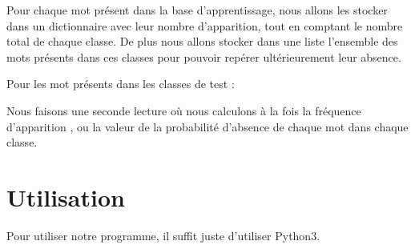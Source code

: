 \documentclass[a4paper,11pt]{article}
\begin{document}
Pour chaque mot présent dans la base d'apprentissage, nous allons les stocker dans un dictionnaire avec leur nombre d'apparition, tout en comptant le nombre total de chaque classe. De plus nous allons stocker dans une liste l'ensemble des mots présents dans ces classes pour pouvoir repérer ultérieurement leur absence.

Pour les mot présents dans les classes de test :

Nous faisons une seconde lecture où nous calculons à la fois la fréquence d'apparition , ou la valeur de la probabilité d'absence de chaque mot dans chaque classe.

\section{Utilisation}

Pour utiliser notre programme, il suffit juste d'utiliser Python3.
\end{document}
